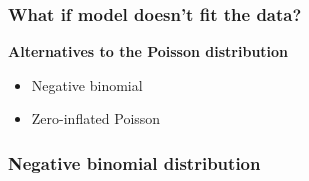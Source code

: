 \documentclass[color=usenames,dvipsnames]{beamer}\usepackage[]{graphicx}\usepackage[]{color}
\begin{document}
\begin{frame}
  \frametitle{What if model doesn't fit the data?}
  \Large
  {\bf Alternatives to the Poisson distribution}
  \begin{itemize}
    \item Negative binomial
    \item Zero-inflated Poisson
  \end{itemize}
\end{frame}





\begin{frame}
  \frametitle{Negative binomial distribution}



\begin{center}
\end{center}
\end{frame}
\end{document}
